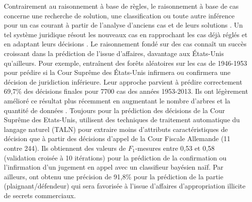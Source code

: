 Contrairement au raisonnement à base de règles, le raisonnement à base de cas concerne une recherche de solution, une classification ou toute autre inférence pour un cas courant à partir de l'analyse d'anciens cas et de leurs solutions \citep{moens2002case-basedreasoning}. Un tel système juridique résout les nouveaux cas en rapprochant les cas déjà réglés et en adaptant leurs décisions \citep{Berka2011rbr-cbr}. Le raisonnement fondé sur des cas connaît un succès croissant dans la prédiction de l'issue d'affaires, davantage aux États-Unis qu'ailleurs. Pour exemple, \citet{katz2014predicting} entraînent des forêts aléatoires \citep{breiman2001randomforest} sur les cas de 1946-1953 pour prédire si la Cour Suprême des États-Unis infirmera ou confirmera une décision de juridiction inférieure. Leur approche parvient à prédire correctement 69,7\% des décisions finales pour 7700 cas des années 1953-2013. Ils ont légèrement amélioré ce résultat plus récemment en augmentant le nombre d'arbres et la quantité de données \citep{katz2017predictsupremecourt}. Toujours pour la prédiction des décisions de la Cour Suprême des Etats-Unis, \citet{waltl2017predictgermantaxlaw} utilisent des techniques de traitement automatique du langage naturel (TALN) pour extraire moins d'attributs caractéristiques de décision que \citep{katz2014predicting} à partir des décisions d'appel de la Cour Fiscale Allemande (11 contre 244). Ils obtiennent des valeurs de $F_1$-mesures entre 0,53 et 0,58 (validation croisée à 10 itérations) pour la prédiction  de la confirmation ou l'infirmation d'un jugement en appel avec un classifieur bayésien naïf.  Par ailleurs, \cite{Ashley2009classifCases} ont obtenu une précision de 91,8\% pour la prédiction de la partie (plaignant/défendeur)  qui sera favorisée à l'issue d'affaires d'appropriation illicite de secrets commerciaux.

